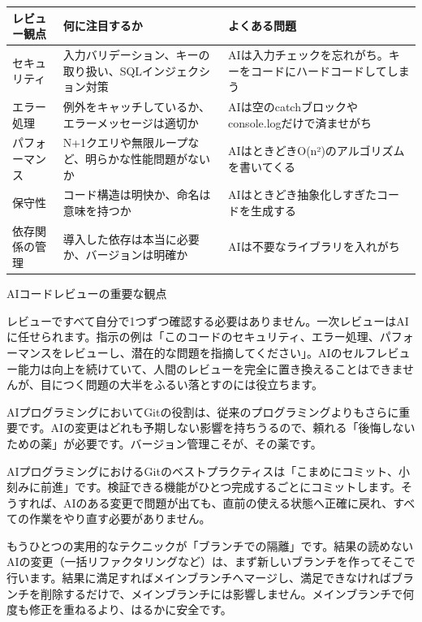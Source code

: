 \begin{center}
\begin{tabularx}{\linewidth}{|X|X|X|}
\hline
\textbf{レビュー観点} & \textbf{何に注目するか} & \textbf{よくある問題} \tabularnewline
\hline
セキュリティ & 入力バリデーション、キーの取り扱い、SQLインジェクション対策 & AIは入力チェックを忘れがち。キーをコードにハードコードしてしまう \tabularnewline
エラー処理 & 例外をキャッチしているか、エラーメッセージは適切か & AIは空のcatchブロックやconsole.logだけで済ませがち \tabularnewline
パフォーマンス & N+1クエリや無限ループなど、明らかな性能問題がないか & AIはときどきO(n²)のアルゴリズムを書いてくる \tabularnewline
保守性 & コード構造は明快か、命名は意味を持つか & AIはときどき抽象化しすぎたコードを生成する \tabularnewline
依存関係の管理 & 導入した依存は本当に必要か、バージョンは明確か & AIは不要なライブラリを入れがち \tabularnewline
\hline
\end{tabularx}
\end{center}

\begin{center}\small\color{gray}AIコードレビューの重要な観点\end{center}

レビューですべて自分で1つずつ確認する必要はありません。一次レビューはAIに任せられます。指示の例は「このコードのセキュリティ、エラー処理、パフォーマンスをレビューし、潜在的な問題を指摘してください」。AIのセルフレビュー能力は向上を続けていて、人間のレビューを完全に置き換えることはできませんが、目につく問題の大半をふるい落とすのには役立ちます。


AIプログラミングにおいてGitの役割は、従来のプログラミングよりもさらに重要です。AIの変更はどれも予期しない影響を持ちうるので、頼れる「後悔しないための薬」が必要です。バージョン管理こそが、その薬です。

AIプログラミングにおけるGitのベストプラクティスは「こまめにコミット、小刻みに前進」です。検証できる機能がひとつ完成するごとにコミットします。そうすれば、AIのある変更で問題が出ても、直前の使える状態へ正確に戻れ、すべての作業をやり直す必要がありません。

もうひとつの実用的なテクニックが「ブランチでの隔離」です。結果の読めないAIの変更（一括リファクタリングなど）は、まず新しいブランチを作ってそこで行います。結果に満足すればメインブランチへマージし、満足できなければブランチを削除するだけで、メインブランチには影響しません。メインブランチで何度も修正を重ねるより、はるかに安全です。

